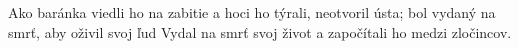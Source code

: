Ako baránka viedli ho na zabitie
a hoci ho týrali, neotvoril ústa; bol vydaný na smrť,
\versseparator
aby oživil svoj ľud
\versseparator
Vydal na smrť svoj život a započítali ho medzi zločincov.